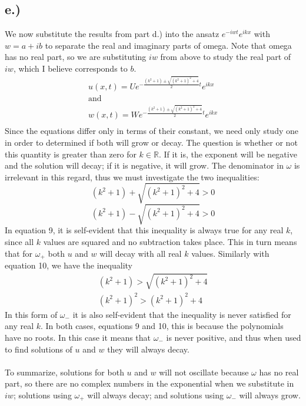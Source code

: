 \documentclass{article}
\newcommand{\R}{\mathbb{R}}
\begin{document}
\subsection*{e.)}
We now substitute the results from part d.) into the ansatz $e^{-iwt}e^{ikx}$ with $w = a + ib$ to separate the real and imaginary parts of omega. Note that omega has no real part, so we are substituting $iw$ from above to study the real part of $iw$, which I believe corresponds to $b$.
\begin{equation}
\begin{aligned}
u(x, t) = Ue^{-\frac{(k^2 + 1) \pm \sqrt{(k^2 + 1)^2 +4}}{2}t}e^{ikx}\\
\text{and}\\
w(x, t) = We^{-\frac{(k^2 + 1) \pm \sqrt{(k^2 + 1)^2 +4}}{2}t}e^{ikx}\\
\end{aligned}
\end{equation}
Since the equations differ only in terms of their constant, we need only study one in order to determined if both will grow or decay. The question is whether or not this quantity is greater than zero for $k \in \R$. If it is, the exponent will be negative and the solution will decay; if it is negative, it will grow. The denominator in $\omega$ is irrelevant in this regard, thus we must investigate the two inequalities:
\begin{equation}
(k^2 + 1) + \sqrt{(k^2 + 1)^2 +4} > 0
\end{equation}
\begin{equation}
(k^2 + 1) - \sqrt{(k^2 + 1)^2 +4} > 0
\end{equation}
In equation 9, it is self-evident that this inequality is always true for any real $k$, since all $k$ values are squared and no subtraction takes place. This in turn means that for $\omega_+$ both $u$ and $w$ will decay with all real $k$ values.
Similarly with equation 10, we have the inequality
\begin{equation}
\begin{aligned}
(k^2 + 1) > \sqrt{(k^2 + 1)^2 +4}\\
(k^2 + 1)^2 > (k^2 +1)^2 + 4
\end{aligned}
\end{equation}
In this form of $\omega_-$ it is also self-evident that the inequality is never satisfied for any real $k$. In both cases, equations 9 and 10, this is because the polynomials have no roots. In this case it means that $\omega_-$ is never positive, and thus when used to find solutions of $u$ and $w$ they will always decay.
\\
\\
To summarize, solutions for both $u$ and $w$ will not oscillate because $\omega$ has no real part, so there are no complex numbers in the exponential when we substitute in $iw$; solutions using $\omega_+$ will always decay; and solutions using $\omega_-$ will always grow.
\end{document}

